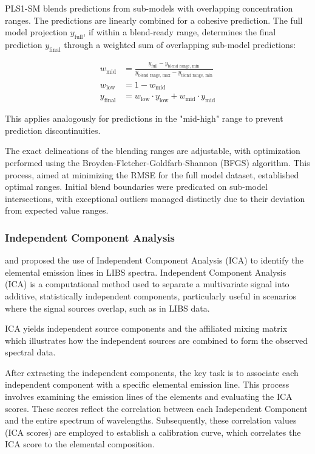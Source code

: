 PLS1-SM blends predictions from sub-models with overlapping concentration ranges. The predictions are linearly combined for a cohesive prediction. The full model projection $y_{\text{full}}$, if within a blend-ready range, determines the final prediction $y_{\text{final}}$ through a weighted sum of overlapping sub-model predictions:

\begin{align*}
w_{\text{mid}} &= \frac{y_{\text{full}}-y_{\text{blend range, min}}}{y_{\text{blend range, max}} - y_{\text{blend range, min}}} \\
w_{\text{low}} &= 1 - w_{\text{mid}} \\
y_{\text{final}} &= w_{\text{low}}\cdot y_{\text{low}} + w_{\text{mid}}\cdot y_{\text{mid}} 
\end{align*}

This applies analogously for predictions in the "mid-high" range to prevent prediction discontinuities.

The exact delineations of the blending ranges are adjustable, with optimization performed using the Broyden-Fletcher-Goldfarb-Shannon (BFGS) algorithm. This process, aimed at minimizing the RMSE for the full model dataset, established optimal ranges. Initial blend boundaries were predicated on sub-model intersections, with exceptional outliers managed distinctly due to their deviation from expected value ranges.

\subsubsection{Independent Component Analysis}\label{sec:ica}
\citet{cleggRecalibrationMarsScience2017} and \cite{forniIndependentComponentAnalysis2013} proposed the use of Independent Component Analysis (ICA) to identify the elemental emission lines in LIBS spectra. Independent Component Analysis (ICA) is a computational method used to separate a multivariate signal into additive, statistically independent components, particularly useful in scenarios where the signal sources overlap, such as in LIBS data.

ICA yields independent source components and the affiliated mixing matrix which illustrates how the independent sources are combined to form the observed spectral data.

After extracting the independent components, the key task is to associate each independent component with a specific elemental emission line. 
This process involves examining the emission lines of the elements and evaluating the ICA scores. 
These scores reflect the correlation between each Independent Component and the entire spectrum of wavelengths. 
Subsequently, these correlation values (ICA scores) are employed to establish a calibration curve, which correlates the ICA score to the elemental composition.

